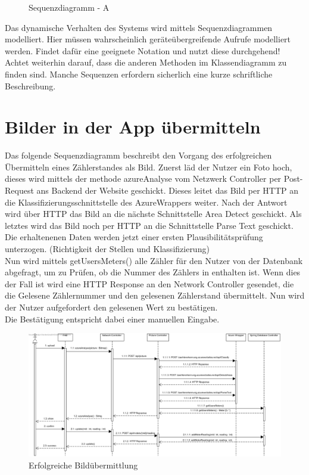 \begin{figure}[h]
	\centering
	\caption{Sequenzdiagramm - A}
	\label{fig:sequenz-a}
\end{figure}


\begin{tcolorbox}
Das dynamische Verhalten des Systems wird mittels Sequenzdiagrammen modelliert.
Hier müssen wahrscheinlich geräteübergreifende Aufrufe modelliert werden.
Findet dafür eine geeignete Notation und nutzt diese durchgehend! 
Achtet weiterhin darauf, dass die anderen Methoden im Klassendiagramm zu finden sind.
Manche Sequenzen erfordern sicherlich eine kurze schriftliche Beschreibung.
\end{tcolorbox}

\section{Bilder in der App übermitteln}
Das folgende Sequenzdiagramm beschreibt den Vorgang des erfolgreichen Übermitteln  eines Zählerstandes als Bild.
Zuerst läd der Nutzer ein Foto hoch, dieses wird mittels der methode azureAnalyse vom Netzwerk Controller per Post-Request ans Backend der Website geschickt. Dieses leitet das Bild per HTTP an die Klassifizierungsschnittstelle des AzureWrappers weiter. Nach der Antwort wird über HTTP das Bild an die nächste Schnittstelle Area Detect geschickt. Als letztes wird das Bild noch per HTTP an die Schnittstelle Parse Text geschickt. Die erhaltenenen Daten werden jetzt einer ersten Plausibilitätsprüfung unterzogen. (Richtigkeit der Stellen und Klassifizierung) \\
Nun wird mittels getUsersMeters() alle Zähler für den Nutzer von der Datenbank abgefragt, um zu Prüfen, ob die Nummer des Zählers in enthalten ist.
Wenn dies der Fall ist wird eine HTTP Response an den Network Controller gesendet, die die Gelesene Zählernummer und den gelesenen Zählerstand übermittelt. Nun wird der Nutzer aufgefordert den gelesenen Wert zu bestätigen. \\
Die Bestätigung entspricht dabei einer manuellen Eingabe.
\begin{figure}[H]
	\centering
	\caption{Erfolgreiche Bildübermittlung}
	\includegraphics[width=16cm]{img/diagrams/SubmitFotoSequence}
\end{figure}

